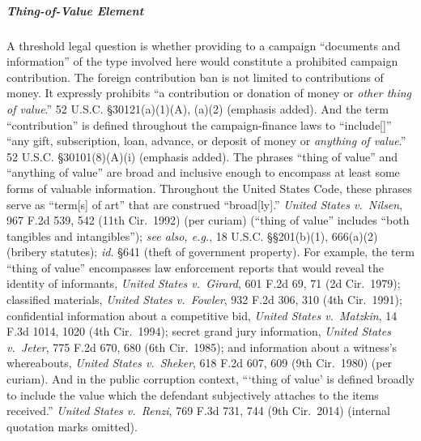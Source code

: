 \subparagraph{Thing-of-Value Element}
A threshold legal question is whether providing to a campaign ``documents and information'' of the type involved here would constitute a prohibited campaign contribution.
The foreign contribution ban is not limited to contributions of money.
It expressly prohibits ``a contribution or donation of money or \textit{other thing of value}.''
52 U.S.C. \S 30121(a)(1)(A), (a)(2) (emphasis added).
And the term ``contribution'' is defined throughout the campaign-finance laws to ``include[]'' ``any gift, subscription, loan, advance, or deposit of money or \textit{anything of value}.''
52 U.S.C. \S 30101(8)(A)(i) (emphasis added).
The phrases ``thing of value'' and ``anything of value'' are broad and inclusive enough to encompass at least some forms of valuable information.
Throughout the United States Code, these phrases serve as ``term[s] of art'' that are construed ``broad[ly].''
\textit{United States v.\ Nilsen}, 967 F.2d 539, 542 (11th Cir.~1992) (per curiam) (``thing of value'' includes ``both tangibles and intangibles''); \textit{see also, e.g.}, 18 U.S.C. \S\S 201(b)(1), 666(a)(2) (bribery statutes); \textit{id.} \S 641 (theft of government property).
For example, the term ``thing of value'' encompasses law enforcement reports that would reveal the identity of informants, \textit{United States v.\ Girard}, 601 F.2d 69, 71 (2d Cir.~1979); classified materials, \textit{United States v.\ Fowler}, 932 F.2d 306, 310 (4th Cir.~1991); confidential information about a competitive bid, \textit{United States v.\ Matzkin}, 14 F.3d 1014, 1020 (4th Cir.~1994); secret grand jury information, \textit{United States v.\ Jeter}, 775 F.2d 670, 680 (6th Cir.~1985); and information about a witness's whereabouts, \textit{United States v.\ Sheker}, 618 F.2d 607, 609 (9th Cir.~1980) (per curiam).
And in the public corruption context, ```thing of value' is defined broadly to include the value which the defendant subjectively attaches to the items received.''
\textit{United States v.\ Renzi}, 769 F.3d 731, 744 (9th Cir.~2014) (internal quotation marks omitted).

